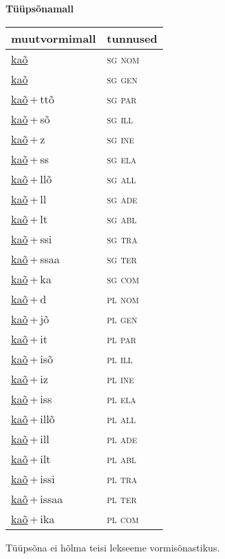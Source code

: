 
\vspace{1.8em}
\begin{minipage}{\textwidth}
\textbf{Tüüpsõnamall \,}\\

\begin{sideways}
\begin{tabular}{l l}
muutvormimall & tunnused \\
\hline
\underline{kaõ} & \textsc{ sg nom } \\
\underline{kaõ} & \textsc{ sg gen } \\
\underline{kaõ}\,+\,ttõ & \textsc{ sg par } \\
\underline{kaõ}\,+\,sõ & \textsc{ sg ill } \\
\underline{kaõ}\,+\,z & \textsc{ sg ine } \\
\underline{kaõ}\,+\,ss & \textsc{ sg ela } \\
\underline{kaõ}\,+\,llõ & \textsc{ sg all } \\
\underline{kaõ}\,+\,ll & \textsc{ sg ade } \\
\underline{kaõ}\,+\,lt & \textsc{ sg abl } \\
\underline{kaõ}\,+\,ssi & \textsc{ sg tra } \\
\underline{kaõ}\,+\,ssaa & \textsc{ sg ter } \\
\underline{kaõ}\,+\,ka & \textsc{ sg com } \\
\underline{kaõ}\,+\,d & \textsc{ pl nom } \\
\underline{kaõ}\,+\,jõ & \textsc{ pl gen } \\
\underline{kaõ}\,+\,it & \textsc{ pl par } \\
\underline{kaõ}\,+\,isõ & \textsc{ pl ill } \\
\underline{kaõ}\,+\,iz & \textsc{ pl ine } \\
\underline{kaõ}\,+\,iss & \textsc{ pl ela } \\
\underline{kaõ}\,+\,illõ & \textsc{ pl all } \\
\underline{kaõ}\,+\,ill & \textsc{ pl ade } \\
\underline{kaõ}\,+\,ilt & \textsc{ pl abl } \\
\underline{kaõ}\,+\,issi & \textsc{ pl tra } \\
\underline{kaõ}\,+\,issaa & \textsc{ pl ter } \\
\underline{kaõ}\,+\,ika & \textsc{ pl com } \\
\end{tabular}
\end{sideways}
\label{tab:tüüpsõnamall-kaõ}

\end{minipage}

 
\vspace{1em}
\noindent Tüüpsõna ei hõlma teisi lekseeme vormi\-sõnastikus.
